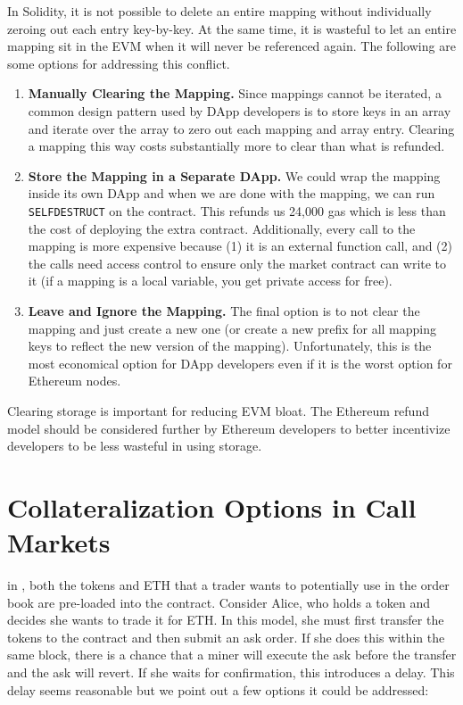 In Solidity, it is not possible to delete an entire mapping without individually zeroing out each entry key-by-key. At the same time, it is wasteful to let an entire mapping sit in the EVM when it will never be referenced again. The following are some options for addressing this conflict.

\begin{enumerate}

\item \textbf{Manually Clearing the Mapping.} Since mappings cannot be iterated, a common design pattern used by DApp developers is to store keys in an array and iterate over the array to zero out each mapping and array entry. Clearing a mapping this way costs substantially more to clear than what is refunded.

\item \textbf{Store the Mapping in a Separate DApp.} We could wrap the mapping inside its own DApp and when we are done with the mapping, we can run \texttt{SELFDESTRUCT} on the contract. This refunds us 24,000 gas which is less than the cost of deploying the extra contract. Additionally, every call to the mapping is more expensive because (1) it is an external function call, and (2) the calls need access control to ensure only the market contract can write to it (if a mapping is a local variable, you get private access for free). 

\item \textbf{Leave and Ignore the Mapping.} The final option is to not clear the mapping and just create a new one (or create a new prefix for all mapping keys to reflect the new version of the mapping). Unfortunately, this is the most economical option for DApp developers even if it is the worst option for Ethereum nodes. 

\end{enumerate}

Clearing storage is important for reducing EVM bloat. The Ethereum refund model should be considered further by Ethereum developers to better incentivize developers to be less wasteful in using storage. 


\section{Collateralization Options in Call Markets}
\label{app:collateral}

in \cm, both the tokens and ETH that a trader wants to potentially use in the order book are pre-loaded into the contract. Consider Alice, who holds a token and decides she wants to trade it for ETH. In this model, she must first transfer the tokens to the contract and then submit an ask order. If she does this within the same block, there is a chance that a miner will execute the ask before the transfer and the ask will revert. If she waits for confirmation, this introduces a delay. This delay seems reasonable but we point out a few options it could be addressed:

